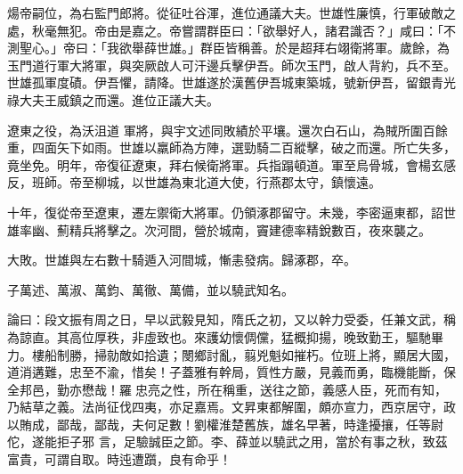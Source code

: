 \begin{pinyinscope}
 煬帝嗣位，為右監門郎將。從征吐谷渾，進位通議大夫。世雄性廉慎，行軍破敵之處，秋毫無犯。帝由是嘉之。帝嘗謂群臣曰：「欲舉好人，諸君識否？」咸曰：「不測聖心。」帝曰：「我欲舉薛世雄。」群臣皆稱善。於是超拜右翊衛將軍。歲餘，為玉門道行軍大將軍，與突厥啟人可汗邊兵擊伊吾。師次玉門，啟人背約，兵不至。世雄孤軍度磧。伊吾懼，請降。世雄遂於漢舊伊吾城東築城，號新伊吾，留銀青光祿大夫王威鎮之而還。進位正議大夫。



 遼東之役，為沃沮道
 軍將，與宇文述同敗績於平壤。還次白石山，為賊所圍百餘重，四面矢下如雨。世雄以羸師為方陣，選勁騎二百縱擊，破之而還。所亡失多，竟坐免。明年，帝復征遼東，拜右候衛將軍。兵指蹋頓道。軍至烏骨城，會楊玄感反，班師。帝至柳城，以世雄為東北道大使，行燕郡太守，鎮懷遠。



 十年，復從帝至遼東，遷左禦衛大將軍。仍領涿郡留守。未幾，李密逼東都，詔世雄率幽、薊精兵將擊之。次河間，營於城南，竇建德率精銳數百，夜來襲之。



 大敗。世雄與左右數十騎遁入河間城，慚恚發病。歸涿郡，卒。



 子萬述、萬淑、萬鈞、萬徹、萬備，並以驍武知名。



 論曰：段文振有周之日，早以武毅見知，隋氏之初，又以幹力受委，任兼文武，稱為諒直。其高位厚秩，非虛致也。來護幼懷倜儻，猛概抑揚，晚致勤王，驅馳畢力。樓船制勝，掃勍敵如拾遺；閿鄉討亂，翦兇魁如摧朽。位班上將，顯居大國，道消遘難，忠至不渝，惜矣！子蓋雅有幹局，質性方嚴，見義而勇，臨機能斷，保全邦邑，勤亦懋哉！羅忠亮之性，所在稱重，送往之節，義感人臣，死而有知，乃結草之義。法尚征伐四夷，亦足嘉焉。文昇東都解圍，頗亦宣力，西京居守，政以賄成，鄙哉，鄙哉，夫何足數！劉權淮楚舊族，雄名早著，時逢擾攘，任等尉佗，遂能拒子邪
 言，足驗誠臣之節。李、薛並以驍武之用，當於有事之秋，致茲富貴，可謂自取。時迍遭躓，良有命乎！



\end{pinyinscope}